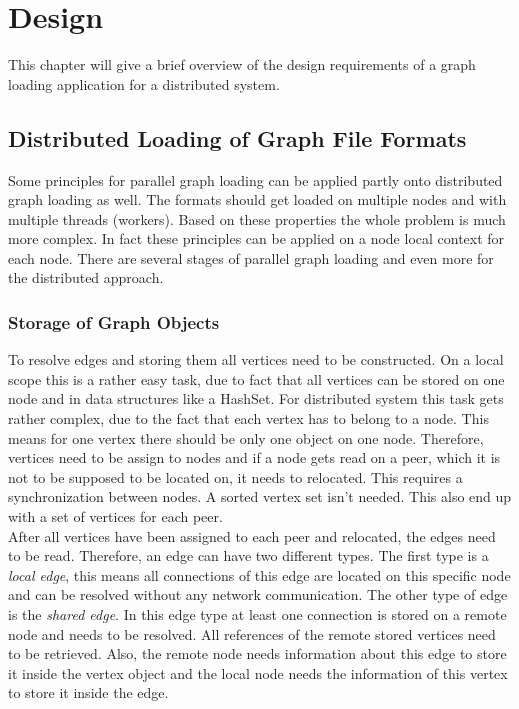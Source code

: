 \chapter{Design}
\label{design}
This chapter will give a brief overview of the design requirements of a graph loading application for a distributed system.
\section{Distributed Loading of Graph File Formats}
Some principles for parallel graph loading\cite{parallelGraphLoading.10} can be applied partly onto distributed graph loading as well. The formats should get loaded on multiple nodes and with multiple threads (workers). Based on these properties the whole problem is much more complex. In fact these principles can be applied on a node local context for each node.
There are several stages of parallel graph loading and even more for the distributed approach.

\subsection{Storage of Graph Objects}
To resolve edges and storing them all vertices need to be constructed. On a local scope this is a rather easy task, due to fact that all vertices can be stored on one node and in data structures like a HashSet. For distributed system this task gets rather complex, due to the fact that each vertex has to belong to a node. This means for one vertex there should be only 
one object on one node. Therefore, vertices need to be assign to nodes and if a node gets read on a peer, which it is not to be supposed to be located on, it needs to relocated. This requires a synchronization between nodes. A sorted vertex set isn't needed. This also end up with a set of vertices for each peer.\\
After all vertices have been assigned to each peer and relocated, the edges need to be read. Therefore, an edge can have two different types. The first type is a \textit{local edge}, this means all connections of this edge are located on this specific node and can be resolved without any network communication.  The other type of edge is the \textit{shared edge}. In this edge type at least one connection is stored on a remote node and needs to be resolved. All references of the remote stored vertices need to be retrieved. Also, the remote node needs information about this edge to store it inside the vertex object and the local node needs the information of this vertex to store it inside the edge.

